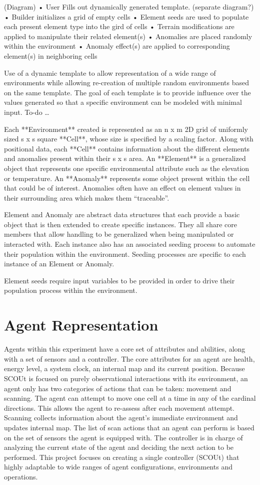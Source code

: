 \documentclass[]{report}
\begin{document}
(Diagram)
•	User Fills out dynamically generated template. (separate diagram?)
•	Builder initializes a grid of empty cells
•	Element seeds are used to populate each present element type into the gird of cells
•	Terrain modifications are applied to manipulate their related element(s)
•	Anomalies are placed randomly within the environment
•	Anomaly effect(s) are applied to corresponding element(s) in neighboring cells

Use of a dynamic template to allow representation of a wide range of environments while allowing re-creation of multiple random environments based on the same template. The goal of each template is to provide influence over the values generated so that a specific environment can be modeled with minimal input. To-do …

Each **Environment** created is represented as an n x m 2D grid of uniformly sized s x s square **Cell**, whose size is specified by a scaling factor. Along with positional data, each **Cell** contains information about the different elements and anomalies present within their s x s area. An **Element** is a generalized object that represents one specific environmental attribute such as the elevation or temperature. An **Anomaly** represents some object present within the cell that could be of interest. Anomalies often have an effect on element values in their surrounding area which makes them “traceable”.

Element and Anomaly are abstract data structures that each provide a basic object that is then extended to create specific instances. They all share core members that allow handling to be generalized when being manipulated or interacted with. Each instance also has an associated seeding process to automate their population within the environment. Seeding processes are specific to each instance of an Element or Anomaly.

Element seeds require input variables to be provided in order to drive their population process within the environment.


\section{Agent Representation}
Agents within this experiment have a core set of attributes and abilities, along with a set of sensors and a controller. The core attributes for an agent are health, energy level, a system clock, an internal map and its current position. Because SCOUt is focused on purely observational interactions with its environment, an agent only has two categories of actions that can be taken: movement and scanning. The agent can attempt to move one cell at a time in any of the cardinal directions. This allows the agent to re-assess after each movement attempt. Scanning collects information about the agent's immediate environment and updates internal map. The list of scan actions that an agent can perform is based on the set of sensors the agent is equipped with. The controller is in charge of analyzing the current state of the agent and deciding the next action to be performed. This project focuses on creating a single controller (SCOUt) that highly adaptable to wide ranges of agent configurations, environments and operations.
\end{document}
